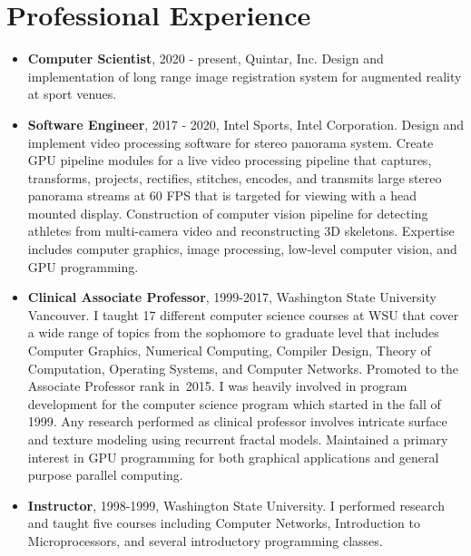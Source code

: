 \documentclass[10pt]{article}
\begin{document}
\section*{Professional Experience}

\begin{itemize}
\item {\bf Computer Scientist}, 2020 - present, Quintar, Inc. 
Design and implementation of long range image registration system
for augmented reality at sport venues.

\item {\bf Software Engineer}, 2017 - 2020,
Intel Sports, Intel Corporation. Design
and implement video processing software for 
stereo panorama system. Create
GPU pipeline modules for a live video processing
pipeline that captures, transforms, projects,
rectifies, stitches, encodes, and transmits
large stereo panorama streams at 60 FPS that is
targeted for viewing
with a head mounted display. 
Construction of computer vision pipeline for detecting
athletes from multi-camera video and reconstructing 3D skeletons.
Expertise
includes computer graphics, image processing,
low-level computer vision, and GPU programming.


\item {\bf Clinical Associate Professor}, 1999-2017,
Washington State University Vancouver.
I taught 17 different computer science courses at WSU that cover a wide
range of topics from the sophomore to graduate level that includes
Computer Graphics, Numerical Computing, Compiler Design, Theory of Computation,
Operating Systems, and Computer Networks.
Promoted
to the Associate Professor rank in~2015.
I was heavily involved in program development for 
the computer science program which started in the fall of 1999.
Any research performed as clinical professor involves intricate surface and texture
modeling using recurrent fractal models. %
Maintained a primary interest in GPU programming for both
graphical applications and general purpose parallel computing.

\item {\bf Instructor}, 1998-1999,
Washington State University. I performed research and taught five
courses including Computer Networks, Introduction to Microprocessors,
and several introductory programming classes.



\end{itemize}
\end{document}
